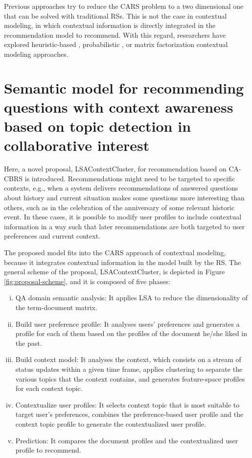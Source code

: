 \documentclass[preprint]{elsarticle}
\begin{document}
\begin{spacing}{1.5}
Previous approaches try to reduce the CARS problem to a two dimensional one that can be solved with traditional RSs. This is not the case in contextual modeling, in which contextual information is directly integrated in the recommendation model to recommend. With this regard, researchers have explored heuristic-based \cite{Panniello2014}, probabilistic \cite{Adomavicius2005b}, or matrix factorization \cite{Baltrunas2011c} contextual modeling approaches.

\section{Semantic model for recommending questions with context awareness based on topic detection in collaborative interest}
\label{sec:proposal}

Here, a novel proposal, LSAContextCluster, for recommendation based on CA-CBRS is introduced. Recommendations might need to be targeted to specific contexts, e.g., when a system delivers recommendations of answered questions about history and current situation makes some questions more interesting than others, such as in the celebration of the anniversary of some relevant historic event. In these cases, it is possible to modify user profiles to include contextual information in a way such that later recommendations are both targeted to user preferences and current context.

The proposed model fits into the CARS approach of contextual modeling, because it integrates contextual information in the model built by the RS. The general scheme of the proposal, LSAContextCluster, is depicted in Figure \ref{fig:proposal-scheme}, and it is composed of five phases:
\begin{enumerate}[(i)]
	\item QA domain semantic analysis: It applies LSA to reduce the dimensionality of the term-document matrix.
	\item Build user preference profile: It analyses users' preferences and generates a profile for each of them based on the profiles of the document he/she liked in the past.
	\item Build context model: It analyses the context, which consists on a stream of status updates within a given time frame, applies clustering to separate the various topics that the context contains, and generates feature-space profiles for each context topic.
	\item Contextualize user profiles: It selects context topic that is most suitable to target user's preferences, combines the preference-based user profile and the context topic profile to generate the contextualized user profile.
	\item Prediction: It compares the document profiles and the contextualized user profile to recommend.
\end{enumerate}


\end{spacing}
\end{document}
